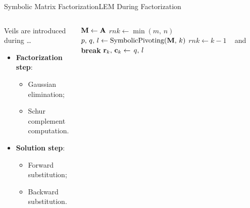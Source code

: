 \begin{frame}{Symbolic Matrix Factorization}{\ac{LEM} During Factorization}
  \vspace{-2.5em}
  \begin{columns}
    \hspace{1.0em}
    \begin{column}[c]{0.425\textwidth}
      Veils are introduced during \dots
      \begin{itemize}
        \item \textbf{Factorization step}: \\
        \begin{itemize}\small
          \item[] Gaussian elimination;
          \item[] Schur complement computation.
        \end{itemize}
        \item \textbf{Solution step}: \\
        \begin{itemize}\small
          \item[] Forward substitution;
          \item[] Backward substitution.
        \end{itemize}
      \end{itemize}
    \end{column}
    \begin{column}[c]{0.4\textwidth}
      \vspace{-1.0em}
      \hspace{-1.0em}
      \begin{algorithmic}\scriptsize
          \State $\mathbf{M} \gets \mathbf{A}$ %
          \State $rnk \gets \min(m, \, n)$ %
            \State $p, \, q, \, l \gets \text{SymbolicPivoting}(\mathbf{M}, \, k)$ %
              \State $rnk \gets k-1$ ~ and ~ %
              \textbf{break} %
            \EndIf
            \State $\mathbf{r}_k, \, \mathbf{c}_k \gets \, q, \, l$ %

\end{algorithmic}
\end{column}
\end{columns}
\end{frame}
